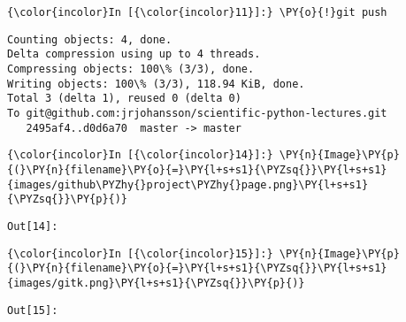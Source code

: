     \begin{Verbatim}[commandchars=\\\{\}]
{\color{incolor}In [{\color{incolor}11}]:} \PY{o}{!}git push
\end{Verbatim}

    \begin{Verbatim}[commandchars=\\\{\}]
Counting objects: 4, done.
Delta compression using up to 4 threads.
Compressing objects: 100\% (3/3), done.
Writing objects: 100\% (3/3), 118.94 KiB, done.
Total 3 (delta 1), reused 0 (delta 0)
To git@github.com:jrjohansson/scientific-python-lectures.git
   2495af4..d0d6a70  master -> master

    \end{Verbatim}





    \begin{Verbatim}[commandchars=\\\{\}]
{\color{incolor}In [{\color{incolor}14}]:} \PY{n}{Image}\PY{p}{(}\PY{n}{filename}\PY{o}{=}\PY{l+s+s1}{\PYZsq{}}\PY{l+s+s1}{images/github\PYZhy{}project\PYZhy{}page.png}\PY{l+s+s1}{\PYZsq{}}\PY{p}{)}
\end{Verbatim}
\texttt{\color{outcolor}Out[{\color{outcolor}14}]:}




    \begin{Verbatim}[commandchars=\\\{\}]
{\color{incolor}In [{\color{incolor}15}]:} \PY{n}{Image}\PY{p}{(}\PY{n}{filename}\PY{o}{=}\PY{l+s+s1}{\PYZsq{}}\PY{l+s+s1}{images/gitk.png}\PY{l+s+s1}{\PYZsq{}}\PY{p}{)}
\end{Verbatim}
\texttt{\color{outcolor}Out[{\color{outcolor}15}]:}





